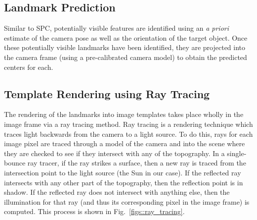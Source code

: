 \documentclass{RPI-SIW}
\begin{document}
\subsection*{Landmark Prediction}
Similar to SPC, potentially visible features are identified using an \textit{a priori} estimate of the camera pose as well as the orientation of the target object. Once these potentially visible landmarks have been identified, they are projected into the camera frame (using a pre-calibrated camera model) to obtain the predicted centers for each.

\subsection*{Template Rendering using Ray Tracing}
The rendering of the landmarks into image templates takes place wholly in the image frame via a ray tracing method.  Ray tracing is a rendering technique which traces light backwards from the camera to a light source.  To do this, rays for each image pixel are traced through a model of the camera and into the scene where they are checked to see if they intersect with any of the topography.  In a single-bounce ray tracer, if the ray strikes a surface, then a new ray is traced from the intersection point to the light source (the Sun in our case).  If the reflected ray intersects with any other part of the topography, then the reflection point is in shadow.  If the reflected ray does not intersect with anything else, then the illumination for that ray (and thus its corresponding pixel in the image frame) is computed.  This process is shown in Fig.~\ref{figs::ray_tracing}.
\end{document}

